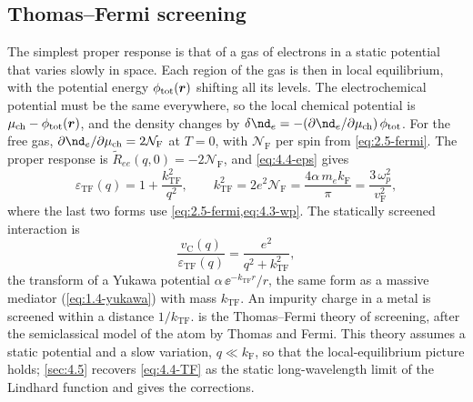 \subsection{Thomas--Fermi screening}

The simplest proper response is that of a gas of electrons in a static potential that varies slowly in space. Each region of the gas is then in local equilibrium, with the potential energy $\phi_{\mathrm{tot}}(\bm{r})$ shifting all its levels. The electrochemical potential must be the same everywhere, so the local chemical potential is $\mu_{\mathrm{ch}} - \phi_{\mathrm{tot}}(\bm{r})$, and the density changes by $\delta\nd_e = -(\partial\nd_e/\partial\mu_{\mathrm{ch}})\,\phi_{\mathrm{tot}}$. For the free gas, $\partial\nd_e/\partial\mu_{\mathrm{ch}} = 2\mathcal{N}_{\mathrm{F}}$ at $T = 0$, with $\mathcal{N}_{\mathrm{F}}$ per spin from \cref{eq:2.5-fermi}. The proper response is $\tilde R_{ee}(q, 0) = -2\mathcal{N}_{\mathrm{F}}$, and \cref{eq:4.4-eps} gives
\begin{equation}
  \varepsilon_{\mathrm{TF}}(q) = 1 + \frac{k_{\mathrm{TF}}^2}{q^2}, \qquad
  k_{\mathrm{TF}}^2 = 2e^2\mathcal{N}_{\mathrm{F}} = \frac{4\alpha\,m_ek_{\mathrm{F}}}{\pi} = \frac{3\,\omega_p^2}{v_{\mathrm{F}}^2} ,
  \label{eq:4.4-TF}
\end{equation}
where the last two forms use \cref{eq:2.5-fermi,eq:4.3-wp}. The statically screened interaction is
\begin{equation*}
  \frac{v_{\mathrm{C}}(q)}{\varepsilon_{\mathrm{TF}}(q)} = \frac{e^2}{q^2 + k_{\mathrm{TF}}^2} ,
\end{equation*}
the transform of a Yukawa potential $\alpha\,\ee^{-k_{\mathrm{TF}}r}/r$, the same form as a massive mediator (\cref{eq:1.4-yukawa}) with mass $k_{\mathrm{TF}}$. An impurity charge in a metal is screened within a distance $1/k_{\mathrm{TF}}$.  is the Thomas--Fermi theory of screening, after the semiclassical model of the atom by Thomas and Fermi. This theory assumes a static potential and a slow variation, $q \ll k_{\mathrm{F}}$, so that the local-equilibrium picture holds; \cref{sec:4.5} recovers \cref{eq:4.4-TF} as the static long-wavelength limit of the Lindhard function and gives the corrections.

